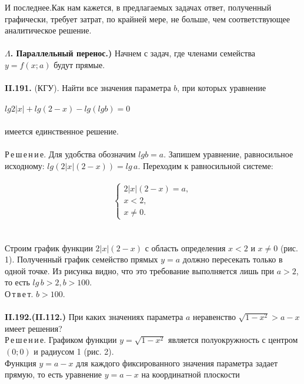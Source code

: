 \documentclass{article}
\begin{document}
И последнее.Как нам кажется, в предлагаемых задачах ответ, полученный графически, требует затрат, по крайней мере, не больше, чем соответствующее аналитическое решение.
\\\\
\noindent \textbf{$\Lambda$. Параллельный перенос.)}
Начнем с задач, где членами семейства $y = f(x;a)$ будут прямые.
\\\\
\noindent \textbf{II.191.} (КГУ). Найти все значения параметра $b$, при которых уравнение
\\\\
$lg2|x| + lg(2-x) - lg(lgb) = 0$
\\\\
имеется единственное решение.
\\\\
Р\,е\,ш\,е\,н\,и\,е. Для удобства обозначим $lgb = a$. Запишем уравнение, равносильное исходному:
$lg (2|x|(2-x)) = lg\,a$. Переходим к равносильной системе:
\\\\
\begin{equation*}
 \begin{cases}
   2 |x|(2 - x) = a, 
   \\
   x < 2,
   \\
   x \ne 0.
 \end{cases}
\end{equation*}
\\\\
Строим график функции $2|x|(2-x)$ с область определения $x < 2$ и $x \ne 0$ (рис. 1). Полученный график семейство прямых $y = a$ должно пересекать только в одной точке. Из рисунка видно, что это требование выполняется лишь при $a > 2$, то есть $lg\,b > 2, b > 100$.
\\
О\,т\,в\,е\,т. $b > 100$.
\\\\
\noindent \textbf{II.192.(II.112.)} При каких значениях параметра $a$ неравенство $\sqrt{1 - x^2} > a - x$ имеет решения?
\\
Р\,е\,ш\,е\,н\,и\,е. Графиком функции $y =  \sqrt{1 - x^2}$ является полуокружность с центром $(0;0)$ и радиусом 1 (рис. 2).
\\
Функция $y = a - x$ для каждого фиксированного значения параметра задает прямую, то есть уравнение $y = a - x$ на координатной плоскости 
 
 
 
\end{document}
